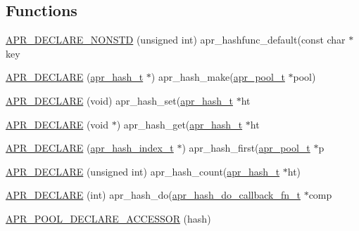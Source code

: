 \subsection*{Functions}
\begin{DoxyCompactItemize}
\item 
\mbox{\hyperlink{group__apr__hash_ga54cef51a6f6906d5fc581b15e0f211aa}{A\+P\+R\+\_\+\+D\+E\+C\+L\+A\+R\+E\+\_\+\+N\+O\+N\+S\+TD}} (unsigned int) apr\+\_\+hashfunc\+\_\+default(const char $\ast$key
\item 
\mbox{\hyperlink{group__apr__hash_ga090f75283396043d20ff43f05df27e2d}{A\+P\+R\+\_\+\+D\+E\+C\+L\+A\+RE}} (\mbox{\hyperlink{group__apr__hash_ga72ec09b8bde6d874c36bd49df915fff6}{apr\+\_\+hash\+\_\+t}} $\ast$) apr\+\_\+hash\+\_\+make(\mbox{\hyperlink{group__apr__pools_gaf137f28edcf9a086cd6bc36c20d7cdfb}{apr\+\_\+pool\+\_\+t}} $\ast$pool)
\item 
\mbox{\hyperlink{group__apr__hash_ga834b9359df0f05d4011048e3ddba5d4a}{A\+P\+R\+\_\+\+D\+E\+C\+L\+A\+RE}} (void) apr\+\_\+hash\+\_\+set(\mbox{\hyperlink{group__apr__hash_ga72ec09b8bde6d874c36bd49df915fff6}{apr\+\_\+hash\+\_\+t}} $\ast$ht
\item 
\mbox{\hyperlink{group__apr__hash_gaf755daf8d4cbb73710384a0a0f54b974}{A\+P\+R\+\_\+\+D\+E\+C\+L\+A\+RE}} (void $\ast$) apr\+\_\+hash\+\_\+get(\mbox{\hyperlink{group__apr__hash_ga72ec09b8bde6d874c36bd49df915fff6}{apr\+\_\+hash\+\_\+t}} $\ast$ht
\item 
\mbox{\hyperlink{group__apr__hash_ga7b2be5093c956710fa54f0338e0f2b01}{A\+P\+R\+\_\+\+D\+E\+C\+L\+A\+RE}} (\mbox{\hyperlink{group__apr__hash_ga3b3d353989f6cea4535630634be147f7}{apr\+\_\+hash\+\_\+index\+\_\+t}} $\ast$) apr\+\_\+hash\+\_\+first(\mbox{\hyperlink{group__apr__pools_gaf137f28edcf9a086cd6bc36c20d7cdfb}{apr\+\_\+pool\+\_\+t}} $\ast$p
\item 
\mbox{\hyperlink{group__apr__hash_gaf86c4ba2e44173e928ccf1e251f3aeee}{A\+P\+R\+\_\+\+D\+E\+C\+L\+A\+RE}} (unsigned int) apr\+\_\+hash\+\_\+count(\mbox{\hyperlink{group__apr__hash_ga72ec09b8bde6d874c36bd49df915fff6}{apr\+\_\+hash\+\_\+t}} $\ast$ht)
\item 
\mbox{\hyperlink{group__apr__hash_gac18b30b00f6ca75fb8e99343e5aa4943}{A\+P\+R\+\_\+\+D\+E\+C\+L\+A\+RE}} (int) apr\+\_\+hash\+\_\+do(\mbox{\hyperlink{group__apr__hash_gafaf9b4435ab207b7708533cb8544face}{apr\+\_\+hash\+\_\+do\+\_\+callback\+\_\+fn\+\_\+t}} $\ast$comp
\item 
\mbox{\hyperlink{group__apr__hash_gab9e4fd3d9d64d5c72a578845d2b1fa25}{A\+P\+R\+\_\+\+P\+O\+O\+L\+\_\+\+D\+E\+C\+L\+A\+R\+E\+\_\+\+A\+C\+C\+E\+S\+S\+OR}} (hash)
\end{DoxyCompactItemize}

